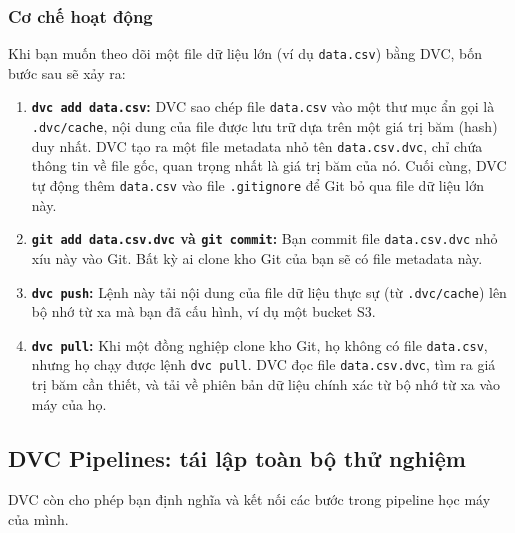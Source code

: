 \subsubsection{Cơ chế hoạt động}
Khi bạn muốn theo dõi một file dữ liệu lớn (ví dụ \texttt{data.csv}) bằng DVC, bốn bước sau sẽ xảy ra:
\begin{enumerate}
    \item \textbf{\texttt{dvc add data.csv}:} DVC sao chép file \texttt{data.csv} vào một thư mục ẩn gọi là \texttt{.dvc/cache}, nội dung của file được lưu trữ dựa trên một giá trị băm (hash) duy nhất. DVC tạo ra một file metadata nhỏ tên \texttt{data.csv.dvc}, chỉ chứa thông tin về file gốc, quan trọng nhất là giá trị băm của nó. Cuối cùng, DVC tự động thêm \texttt{data.csv} vào file \texttt{.gitignore} để Git bỏ qua file dữ liệu lớn này.
    \item \textbf{\texttt{git add data.csv.dvc} và \texttt{git commit}:} Bạn commit file \texttt{data.csv.dvc} nhỏ xíu này vào Git. Bất kỳ ai clone kho Git của bạn sẽ có file metadata này.
    \item \textbf{\texttt{dvc push}:} Lệnh này tải nội dung của file dữ liệu thực sự (từ \texttt{.dvc/cache}) lên bộ nhớ từ xa mà bạn đã cấu hình, ví dụ một bucket S3.
    \item \textbf{\texttt{dvc pull}:} Khi một đồng nghiệp clone kho Git, họ không có file \texttt{data.csv}, nhưng họ chạy được lệnh \texttt{dvc pull}. DVC đọc file \texttt{data.csv.dvc}, tìm ra giá trị băm cần thiết, và tải về phiên bản dữ liệu chính xác từ bộ nhớ từ xa vào máy của họ.
\end{enumerate}

\begin{center}
    \label{fig:dvc_workflow}
\end{center}

\subsection{DVC Pipelines: tái lập toàn bộ thử nghiệm}
\label{ssec:dvc_pipelines}
DVC còn cho phép bạn định nghĩa và kết nối các bước trong pipeline học máy của mình.

